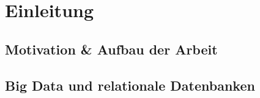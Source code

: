\section{Einleitung}

\subsection{Motivation \& Aufbau der Arbeit}

\subsection{Big Data und relationale Datenbanken}